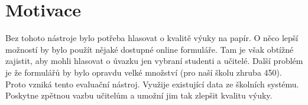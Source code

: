 \section{Motivace}
 Bez tohoto nástroje bylo potřeba hlasovat o kvalitě výuky na papír. O něco lepší možností by bylo použít nějaké dostupné online formuláře. Tam je však obtížné zajistit, aby mohli hlasovat o úvazku jen vybraní studenti a učitelé. Další problém je že formulářů by bylo opravdu velké množství (pro naší školu zhruba 450). Proto vzniká tento evaluační nástroj. Využije existující data ze školních systému. Poskytne zpětnou vazbu učitelům a umožní jim tak zlepšit kvalitu výuky.
